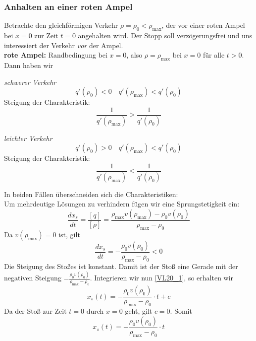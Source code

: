 \documentclass[]{article}
\begin{document}
\subsubsection*{Anhalten an einer roten Ampel}
Betrachte den gleichförmigen Verkehr $\rho = \rho_0 < \rho_{\max}$, der vor einer roten Ampel bei $x=0$ zur Zeit $t=0$ angehalten wird. Der Stopp soll verzögerungsfrei und uns interessiert der Verkehr \textit{vor} der Ampel. \\
\textbf{rote Ampel:} Randbedingung bei $x=0$, also $\rho = \rho_{\max}$ bei $x=0$ für alle $t>0$. \\
Dann haben wir
\begin{center}
	\begin{minipage}{6cm}
		\begin{center}
			\textit{schwerer Verkehr}\\
			\[q'(\rho_0) < 0 \quad q'(\rho_{\max}) < q'(\rho_0)\]
			Steigung der Charakteristik:
			\[ \frac{1}{q'(\rho_{\max})} > \frac{1}{q'(\rho_0)} \]
		\end{center}
	\end{minipage}
	\hspace{0.5cm}
	\begin{minipage}{6cm}
		\begin{center}
			\textit{leichter Verkehr} \\
			\[q'(\rho_0) > 0 \quad q'(\rho_{\max}) < q'(\rho_0)\]
			Steigung der Charakteristik:
			\[ \frac{1}{q'(\rho_{\max})} < \frac{1}{q'(\rho_0)} \]
		\end{center}
	\end{minipage}
\end{center}
In beiden Fällen überschneiden sich die Charakteristiken:\\
Um mehrdeutige Lösungen zu verhindern fügen wir eine Sprungstetigkeit ein:
\[ \frac{d x_s}{d t} = \frac{[q]}{[\rho]} = \frac{\rho_{\max} v(\rho_{\max}) - \rho_0 v(\rho_0)}{\rho_{\max} - \rho_0} \]
Da $v(\rho_{\max}) = 0$ ist, gilt
\begin{equation}
\frac{d x_s}{d t} = - \frac{\rho_0 v(\rho_0)}{\rho_{\max} - \rho_0} < 0 \label{VL20_1}
\end{equation}
Die Steigung des Stoßes ist konstant. Damit ist der Stoß eine Gerade mit der negativen Steigung $ - \frac{\rho_0 v(\rho_0)}{\rho_{\max} - \rho_0}$. Integrieren wir nun \eqref{VL20_1}, so erhalten wir 
\[ x_s(t) = - \frac{\rho_0 v(\rho_0)}{\rho_{\max} - \rho_0} \cdot t + c  \]
Da der Stoß zur Zeit $t=0$ durch $x=0$ geht, gilt $c=0$. Somit
\[ x_s(t) = - \frac{\rho_0 v(\rho_0)}{\rho_{\max} - \rho_0} \cdot t \]
\end{document}
